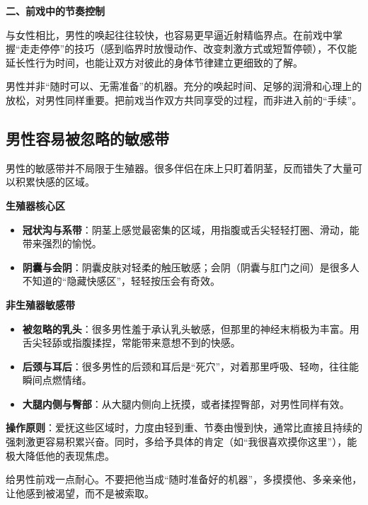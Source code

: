 \documentclass[12pt,UTF8]{ctexbook}
\begin{document}
\textbf{二、前戏中的节奏控制}

与女性相比，男性的唤起往往较快，也容易更早逼近射精临界点。在前戏中掌握“走走停停”的技巧（感到临界时放慢动作、改变刺激方式或短暂停顿），不仅能延长性行为时间，也能让双方对彼此的身体节律建立更细致的了解。

\begin{tcolorbox}[colback=pink!5!white,colframe=red!50!black,title=贴心小叮咛]
男性并非“随时可以、无需准备”的机器。充分的唤起时间、足够的润滑和心理上的放松，对男性同样重要。把前戏当作双方共同享受的过程，而非进入前的“手续”。
\end{tcolorbox}

\subsection{男性容易被忽略的敏感带}

男性的敏感带并不局限于生殖器。很多伴侣在床上只盯着阴茎，反而错失了大量可以积累快感的区域。

\textbf{生殖器核心区}

\begin{itemize}
\item \textbf{冠状沟与系带}：阴茎上感觉最密集的区域，用指腹或舌尖轻轻打圈、滑动，能带来强烈的愉悦。
\item \textbf{阴囊与会阴}：阴囊皮肤对轻柔的触压敏感；会阴（阴囊与肛门之间）是很多人不知道的“隐藏快感区”，轻轻按压会有奇效。
\end{itemize}

\textbf{非生殖器敏感带}

\begin{itemize}
\item \textbf{被忽略的乳头}：很多男性羞于承认乳头敏感，但那里的神经末梢极为丰富。用舌尖轻舔或指腹揉捏，常能带来意想不到的快感。
\item \textbf{后颈与耳后}：很多男性的后颈和耳后是“死穴”，对着那里呼吸、轻吻，往往能瞬间点燃情绪。
\item \textbf{大腿内侧与臀部}：从大腿内侧向上抚摸，或者揉捏臀部，对男性同样有效。
\end{itemize}

\textbf{操作原则}：爱抚这些区域时，力度由轻到重、节奏由慢到快，通常比直接且持续的强刺激更容易积累兴奋。同时，多给予具体的肯定（如“我很喜欢摸你这里”），能极大降低他的表现焦虑。

\begin{tcolorbox}[colback=pink!5!white,colframe=red!50!black,title=贴心小叮咛]
给男性前戏一点耐心。不要把他当成“随时准备好的机器”，多摸摸他、多亲亲他，让他感到被渴望，而不是被索取。
\end{tcolorbox}
\end{document}
